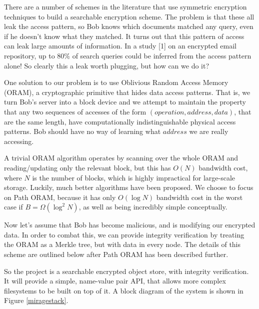 \documentclass[12pt,a4paper,twoside]{article}
\begin{document}
There are a number of schemes in the literature that use symmetric encryption techniques to build a searchable encryption scheme. The problem is that these all leak the access pattern, so Bob knows which documents matched any query, even if he doesn't know what they matched. It turns out that this pattern of access can leak large amounts of information. In a study [1] on an encrypted email repository, up to 80\% of search queries could be inferred from the access pattern alone! So clearly this a leak worth plugging, but how can we do it?


One solution to our problem is to use Oblivious Random Access Memory (ORAM), a cryptographic primitive that hides data access patterns. That is, we turn Bob's server into a block device and we attempt to maintain the property that any two sequences of accesses of the form $(operation,address,data)$, that are the same length, have computationally indistinguishable physical access patterns. Bob should have no way of learning what $address$ we are really accessing.

A trivial ORAM algorithm operates by scanning over the whole ORAM and reading/updating only the relevant block, but this has $O(N)$ bandwidth cost, where $N$ is the number of blocks, which is highly impractical for large-scale storage. Luckily, much better algorithms have been proposed. We choose to focus on Path ORAM, because it has only $O(\log N)$ bandwidth cost in the worst case if $B = \Omega(\log^2 N)$, as well as being incredibly simple conceptually.


Now let's assume that Bob has become malicious, and is modifying our encrypted data. In order to combat this, we can provide integrity verification by treating the ORAM as a Merkle tree, but with data in every node. The details of this scheme are outlined below after Path ORAM has been described further.

So the project is a searchable encrypted object store, with integrity verification. It will provide a simple, name-value pair API, that allows more complex filesystems to be built on top of it. A block diagram of the system is shown in Figure \ref{miragestack}.
\end{document}
